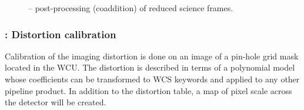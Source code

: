 \begin{figure}[hb]
    \centering
    \def \globalscale {0.700000}
    \fontsize{10}{12}\selectfont
    
  \caption[Recipe: ]{%
     -- post-processing (coaddition)
    of reduced  science frames.}
  \label{fig:metis_lm_img_sci_postprocess}
\end{figure}

\clearpage
\subsubsection{:  Distortion calibration}
\label{rec:metis_lm_img_distortion}
\label{lm_img_distortion}
\label{rec:lm_img_distortion}
\label{sssec:lm_img_distortion}

Calibration of the imaging distortion is done on an image of a
pin-hole grid mask located in the \ac{WCU}. The
distortion is described in terms of a polynomial model whose
coefficients can be transformed to WCS keywords and applied to any
other pipeline product. In addition to the distortion table, a map of
pixel scale across the detector will be created.

